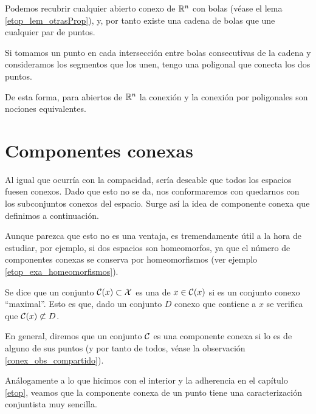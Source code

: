 \begin{obs}
	Podemos recubrir cualquier abierto conexo de $\mathbb{R}^n$ con bolas (véase el lema \ref{etop_lem_otrasProp}), y, por tanto existe una cadena de bolas que une cualquier par de puntos.
	
	Si tomamos un punto en cada intersección entre bolas consecutivas de la cadena y consideramos los segmentos que los unen, tengo una poligonal que conecta los dos puntos.
	
	De esta forma, para abiertos de $\mathbb{R}^n$ la conexión y la conexión por poligonales son nociones equivalentes.
\end{obs}

\section{Componentes conexas}

Al igual que ocurría con la compacidad, sería deseable que todos los espacios fuesen conexos. Dado que esto no se da, nos conformaremos con quedarnos con los subconjuntos conexos del espacio. Surge así la idea de componente conexa que definimos a continuación.

Aunque parezca que esto no es una ventaja, es tremendamente útil a la hora de estudiar, por ejemplo, si dos espacios son homeomorfos, ya que el número de componentes conexas se conserva por homeomorfismos (ver ejemplo \ref{etop_exa_homeomorfismos}).

\begin{defi}
	Se dice que un conjunto $\mathcal{C}(x)\subset\mathcal{X}$ es una  de $x\in\mathcal{C}(x)$ si es un conjunto conexo ``maximal''. Esto es que, dado un conjunto $D$ conexo que contiene a $x$ se verifica que $\mathcal{C}(x)\not\subset D$.
	
	En general, diremos que un conjunto $\mathcal{C}$ es una componente conexa si lo es de alguno de sus puntos (y por tanto de todos, véase la observación \ref{conex_obs_compartido}).
\end{defi}

Análogamente a lo que hicimos con el interior y la adherencia en el capítulo \ref{etop}, veamos que la componente conexa de un punto tiene una caracterización conjuntista muy sencilla.


